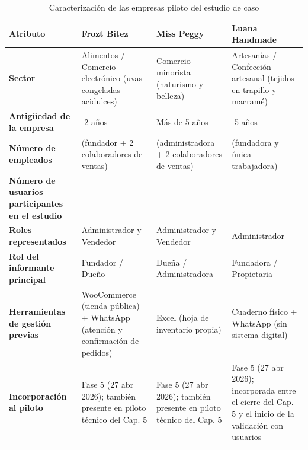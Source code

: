 \begin{longtable}[]{@{}
  >{\raggedright\arraybackslash}p{}
  >{\raggedright\arraybackslash}p{}
  >{\raggedright\arraybackslash}p{}
  >{\raggedright\arraybackslash}p{}@{}}
\caption[Caracterización de las empresas piloto del estudio de caso]{Caracterización de las empresas piloto del estudio de caso}\tabularnewline
\toprule\noalign{}
\begin{minipage}[b]{\linewidth}\raggedright
Atributo
\end{minipage} & \begin{minipage}[b]{\linewidth}\raggedright
Frozt Bitez
\end{minipage} & \begin{minipage}[b]{\linewidth}\raggedright
Miss Peggy
\end{minipage} & \begin{minipage}[b]{\linewidth}\raggedright
Luana Handmade
\end{minipage} \\
\midrule\noalign{}
\endhead
\bottomrule\noalign{}
\endlastfoot
\textbf{Sector} & Alimentos / Comercio electrónico (uvas congeladas acidulces) & Comercio minorista (naturismo y belleza) & Artesanías / Confección artesanal (tejidos en trapillo y macramé) \\
\textbf{Antigüedad de la empresa} & 1-2 años & Más de 5 años & 4-5 años \\
\textbf{Número de empleados} & 3 (fundador + 2 colaboradores de ventas) & 3 (administradora + 2 colaboradores de ventas) & 1 (fundadora y única trabajadora) \\
\textbf{Número de usuarios participantes en el estudio} & 3 & 3 & 1 \\
\textbf{Roles representados} & Administrador y Vendedor & Administrador y Vendedor & Administrador \\
\textbf{Rol del informante principal} & Fundador / Dueño & Dueña / Administradora & Fundadora / Propietaria \\
\textbf{Herramientas de gestión previas} & WooCommerce (tienda pública) + WhatsApp (atención y confirmación de pedidos) & Excel (hoja de inventario propia) & Cuaderno físico + WhatsApp (sin sistema digital) \\
\textbf{Incorporación al piloto} & Fase 5 (27 abr 2026); también presente en piloto técnico del Cap. 5 & Fase 5 (27 abr 2026); también presente en piloto técnico del Cap. 5 & Fase 5 (27 abr 2026); incorporada entre el cierre del Cap. 5 y el inicio de la validación con usuarios \\
\end{longtable}

